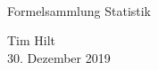 \begin{titlepage}

  \\ \vspace{3cm}
  
  \begin{center}
    {
      \Huge Formelsammlung Statistik}
    \vspace{0.5cm}
    
    \begin{Large}
      Tim Hilt\\
      \vspace{0.4cm}
      30. Dezember 2019\\
    \end{Large}
    
  \end{center}
\end{titlepage}


